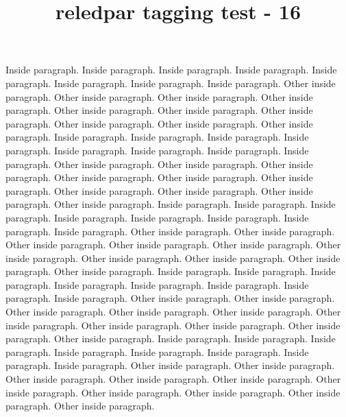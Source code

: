 \documentclass{article}
\title{reledpar tagging test - 16}
\begin{document}
\AtBeginPairs{\sloppy}
\begin{pairs}
    \begin{Leftside}
        \beginnumbering
            \pstart
                Inside paragraph. Inside paragraph. Inside paragraph. Inside paragraph. Inside paragraph. Inside paragraph. Inside paragraph. Inside paragraph.
            \pend
            \pstart
                Other inside paragraph.  Other inside paragraph.  Other inside paragraph.  Other inside paragraph.  Other inside paragraph.  Other inside paragraph.  Other inside paragraph.  Other inside paragraph.  Other inside paragraph.  Other inside paragraph.
            \pend
                        \pstart
                Inside paragraph. Inside paragraph. Inside paragraph. Inside paragraph. Inside paragraph. Inside paragraph. Inside paragraph. Inside paragraph.
            \pend
            \pstart
                Other inside paragraph.  Other inside paragraph.  Other inside paragraph.  Other inside paragraph.  Other inside paragraph.  Other inside paragraph.  Other inside paragraph.  Other inside paragraph.  Other inside paragraph.  Other inside paragraph.
            \pend
                        \pstart
                Inside paragraph. Inside paragraph. Inside paragraph. Inside paragraph. Inside paragraph. Inside paragraph. Inside paragraph. Inside paragraph.
            \pend
            \pstart
                Other inside paragraph.  Other inside paragraph.  Other inside paragraph.  Other inside paragraph.  Other inside paragraph.  Other inside paragraph.  Other inside paragraph.  Other inside paragraph.  Other inside paragraph.  Other inside paragraph.
            \pend
                        \pstart
                Inside paragraph. Inside paragraph. Inside paragraph. Inside paragraph. Inside paragraph. Inside paragraph. Inside paragraph. Inside paragraph.
            \pend
            \pstart
                Other inside paragraph.  Other inside paragraph.  Other inside paragraph.  Other inside paragraph.  Other inside paragraph.  Other inside paragraph.  Other inside paragraph.  Other inside paragraph.  Other inside paragraph.  Other inside paragraph.
            \pend
                        \pstart
                Inside paragraph. Inside paragraph. Inside paragraph. Inside paragraph. Inside paragraph. Inside paragraph. Inside paragraph. Inside paragraph.
            \pend
            \pstart
                Other inside paragraph.  Other inside paragraph.  Other inside paragraph.  Other inside paragraph.  Other inside paragraph.  Other inside paragraph.  Other inside paragraph.  Other inside paragraph.  Other inside paragraph.  Other inside paragraph.

\end{Leftside}
\end{pairs}
\end{document}
